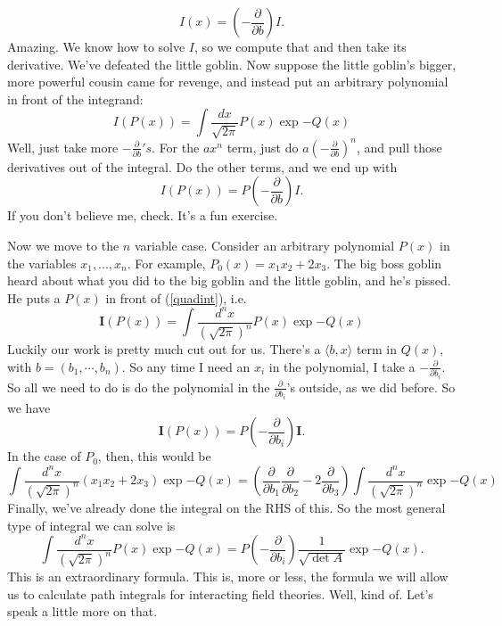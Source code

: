 \documentclass{book}
\begin{document}
\begin{equation} \label{amazing}
I(x) = \left( -\frac{\partial}{\partial b}\right) I.
\end{equation}
Amazing. We know how to solve $I$, so we compute that and then take its derivative. We've defeated the little goblin. Now suppose the little goblin's bigger, more powerful cousin came for revenge, and instead put an arbitrary polynomial in front of the integrand:
\[
I(P(x)) = \int \frac{dx}{\sqrt{2\pi}} P(x) \exp{-Q(x)}
\]
Well, just take more $-\frac{\partial}{\partial b}'s$. For the $a x^n$ term, just do $a (-\frac{\partial}{\partial b})^n$, and pull those derivatives out of the integral. Do the other terms, and we end up with
\[
I(P(x)) = P\left( - \frac{\partial}{\partial b} \right) I.
\]
If you don't believe me, check. It's a fun exercise.

Now we move to the $n$ variable case. Consider an arbitrary polynomial $P(x)$ in the variables $x_1,...,x_n$. For example, $P_0 (x) = x_1 x_2 + 2 x_3$. The big boss goblin heard about what you did to the big goblin and the little goblin, and he's pissed. He puts a $P(x)$ in front of (\ref{quadint}), i.e. 
\[
\mathbf{I} (P(x)) = \int \frac{d^n x}{(\sqrt{2\pi})^n} P(x) \exp{-Q(x)}
\]
Luckily our work is pretty much cut out for us. There's a $\langle b,x \rangle$ term in $Q(x)$, with $b = (b_1, \cdots, b_n)$. So any time I need an $x_i$ in the polynomial, I take a $-\frac{\partial}{\partial b_i}$. So all we need to do is do the polynomial in the $\frac{\partial}{\partial b_i}$'s outside, as we did before. So we have
\begin{equation} \label{bbg}
\boxed{\mathbf{I} (P(x)) = P\left(-\frac{\partial}{\partial b_i}\right) \mathbf{I}.}
\end{equation}
In the case of $P_0$, then, this would be
\[
\int \frac{d^n x}{(\sqrt{2\pi})^n} (x_1 x_2 + 2x_3) \exp{-Q(x)} =
\left(\frac{\partial}{\partial b_1} \frac{\partial}{\partial b_2} - 2 \frac{\partial}{\partial b_3} \right) \int \frac{d^n x}{(\sqrt{2\pi})^n} \exp{-Q(x)}
\]
Finally, we've already done the integral on the RHS of this. So the most general type of integral we can solve is
\begin{equation} \label{bigdaddy}
\boxed{\int \frac{d^n x}{(\sqrt{2\pi})^n} P(x) \exp{-Q(x)} = P\left(-\frac{\partial}{\partial b_i}\right)  \frac{1}{\sqrt{\det A}} \exp{-Q(x)}.}
\end{equation}
This is an extraordinary formula. This is, more or less, the formula we will allow us to calculate path integrals for interacting field theories. Well, kind of. Let's speak a little more on that.
\end{document}
